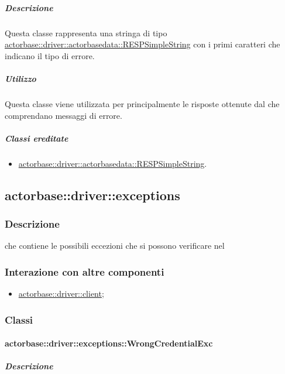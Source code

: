 \documentclass{scalatekids-article}
\begin{document}
\subparagraph{Descrizione}

Questa classe rappresenta una stringa di tipo \hyperref[sec:actorbase::driver::actorbasedata::RESPSimpleString]{actorbase::driver::actorbasedata::RESPSimpleString}
con i primi caratteri che indicano il tipo di errore.

\subparagraph{Utilizzo}

Questa classe viene utilizzata per  principalmente le
risposte ottenute dal  che comprendano messaggi di errore.

\subparagraph{Classi ereditate}

\begin{itemize}
\item \hyperref[sec:actorbase::driver::actorbasedata::RESPSimpleString]{actorbase::driver::actorbasedata::RESPSimpleString}.
\end{itemize}


\subsection{actorbase::driver::exceptions}
\label{sec:actorbase::driver::exceptions}

\subsubsection{Descrizione}

 che contiene le possibili eccezioni che si possono verificare nel 

\subsubsection{Interazione con altre componenti}
\begin{itemize}
\item \hyperref[sec:actorbase::driver::client]{actorbase::driver::client};
\end{itemize}

\subsubsection{Classi}

\paragraph{actorbase::driver::exceptions::WrongCredentialExc}

\subparagraph{Descrizione}
\end{document}

